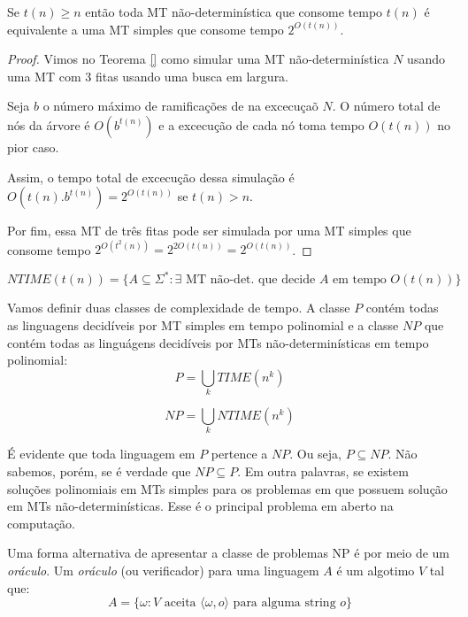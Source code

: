\begin{theorem}
  Se $t(n) \geq n$ então toda MT não-determinística que consome tempo $t(n)$ é equivalente a uma MT simples que consome tempo $2^{O(t(n))}$.
\end{theorem}
\begin{proof}
  Vimos no Teorema \ref{} como simular uma MT não-determinística $N$ usando uma MT com 3 fitas usando uma busca em largura.

  Seja $b$ o número máximo de ramificações de na excecuçaõ $N$.
  O número total de nós da árvore é $O(b^{t(n)})$ e a excecução de cada nó toma tempo $O(t(n))$ no pior caso.

  Assim, o tempo total de excecução dessa simulação é $O(t(n).b^{t(n)}) = 2^{O(t(n))}$ se $t(n) > n$.

  Por fim, essa MT de três fitas pode ser simulada por uma MT simples que consome tempo $2^{O(t^2(n))} = 2^{2O(t(n))} = 2^{O(t(n))}$.
\end{proof}

\begin{displaymath}
  NTIME(t(n)) = \{A \subseteq \Sigma^* : \textrm{$\exists$ MT não-det. que decide $A$ em tempo $O(t(n))$}\}
\end{displaymath}

Vamos definir duas classes de complexidade de tempo.
A classe $P$ contém todas as linguagens decidíveis por MT simples em tempo polinomial e a classe $NP$ que contém todas as linguágens decidíveis por MTs não-determinísticas em tempo polinomial:
\begin{displaymath}
  P = \bigcup_k TIME(n^k)
\end{displaymath}

\begin{displaymath}
  NP = \bigcup_k NTIME(n^k)
\end{displaymath}

É evidente que toda linguagem em $P$ pertence a $NP$.
Ou seja, $P \subseteq NP$.
Não sabemos, porém, se é verdade que $NP \subseteq P$.
Em outra palavras, se existem soluções polinomiais em MTs simples para os problemas em que possuem solução em MTs não-determinísticas.
Esse é o principal problema em aberto na computação.

Uma forma alternativa de apresentar a classe de problemas NP é por meio de um {\em oráculo}.
Um {\em oráculo} (ou verificador) para uma linguagem $A$ é um algotimo $V$ tal que:
\begin{displaymath}
  A = \{\omega : V \textrm{ aceita $\langle \omega, o \rangle$ para alguma string $o$}\}
\end{displaymath}

